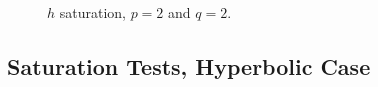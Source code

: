 \vspace*{\fill}
\begin{figure}[!ht]
    \begin{subfigure}[t]{0.49\textwidth}
        \centering
        
        \label{graph:2_2_par_h_sat_l2l2}
    \end{subfigure}
    \hfill
    \begin{subfigure}[t]{0.49\textwidth}
        \centering
        
        \label{graph:2_2_par_h_sat_l2h1}
    \end{subfigure}
    \par\bigskip
    \begin{subfigure}[t]{0.49\textwidth}
        \centering
        
        \label{graph:2_2_par_h_sat_l2T}
    \end{subfigure}
    \hfill
    \begin{subfigure}[t]{0.49\textwidth}
        \centering
        
        \label{graph:2_2_par_h_sat_linfl2}
    \end{subfigure}
    \caption{$h$ saturation, $p = 2$ and $q = 2$.}
\end{figure}
\vspace*{\fill}

\newpage
\subsection{Saturation Tests, Hyperbolic Case} \label{sec:saturation_2}


